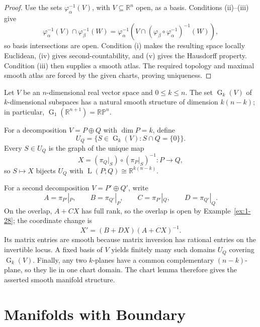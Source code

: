 \begin{proof}

\sketch Use the sets $\varphi_\alpha^{-1}(V)$, with
$V\subseteq\mathbb R^n$ open, as a basis. Conditions (ii)--(iii) give
\[
\varphi_\alpha^{-1}(V)\cap\varphi_\beta^{-1}(W)
=\varphi_\alpha^{-1}\!\left(
V\cap(\varphi_\beta\circ\varphi_\alpha^{-1})^{-1}(W)\right),
\]
so basis intersections are open. Condition (i) makes the resulting space
locally Euclidean, (iv) gives second-countability, and (v) gives the Hausdorff
property. Condition (iii) then supplies a smooth atlas. The required topology
and maximal smooth atlas are forced by the given charts, proving uniqueness.
\end{proof}

\begin{example}
\label{ex:1-36}





Let $V$ be an $n$-dimensional real vector space and $0\leq k\leq n$. The set
$\operatorname G_k(V)$ of $k$-dimensional subspaces has a natural smooth
structure of dimension $k(n-k)$; in particular,
$\operatorname G_1(\mathbb R^{n+1})=\mathbb{RP}^n$.

For a decomposition $V=P\oplus Q$ with $\dim P=k$, define
\[
U_Q=\{S\in\operatorname G_k(V):S\cap Q=\{0\}\}.
\]
Every $S\in U_Q$ is the graph of the unique map
\[
X=(\pi_Q|_S)\circ(\pi_P|_S)^{-1}:P\to Q,
\]
so $S\mapsto X$ bijects $U_Q$ with
$\operatorname L(P;Q)\cong\mathbb R^{k(n-k)}$.

For a second decomposition $V=P'\oplus Q'$, write
\[
A=\pi_{P'}|_P,\qquad B=\pi_{Q'}|_P,\qquad
C=\pi_{P'}|_Q,\qquad D=\pi_{Q'}|_Q.
\]
On the overlap, $A+CX$ has full rank, so the overlap is open by
Example~\ref{ex:1-28}; the coordinate change is
\[
X'=(B+DX)(A+CX)^{-1}.
\]
Its matrix entries are smooth because matrix inversion has rational entries on
the invertible locus. A fixed basis of $V$ yields finitely many such domains
$U_Q$ covering $\operatorname G_k(V)$. Finally, any two $k$-planes have a
common complementary $(n-k)$-plane, so they lie in one chart domain. The chart
lemma therefore gives the asserted smooth manifold structure.
\end{example}


\section{Manifolds with Boundary}

